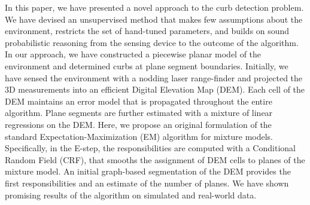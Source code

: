 In this paper, we have presented a novel approach to the curb detection problem.
We have devised an unsupervised method that makes
few assumptions about the environment, restricts the set of hand-tuned
parameters, and builds on sound probabilistic reasoning from the sensing device
to the outcome of the algorithm. In our approach, we have constructed a piecewise
planar model of the environment and determined curbs at plane segment boundaries.
Initially, we have sensed the environment with a nodding laser range-finder and
projected the 3D measurements into an efficient Digital Elevation Map (DEM). Each
cell of the DEM maintains an error model that is propagated throughout the
entire algorithm. Plane segments are further estimated with a mixture of linear
regressions on the DEM. Here, we propose an original formulation of the standard
Expectation-Maximization (EM) algorithm for mixture models. Specifically, in the
E-step, the responsibilities are computed with a Conditional Random Field (CRF),
that smooths the assignment of DEM cells to planes of the mixture model. An
initial graph-based segmentation of the DEM provides the first responsibilities
and an estimate of the number of planes. We have shown promising results of the
algorithm on simulated and real-world data.
